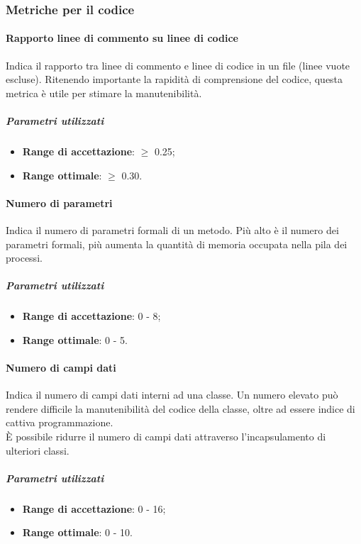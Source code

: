 \documentclass[../PianoDiQualifica.tex]{subfiles}
\begin{document}
			\subsubsection{Metriche per il codice}
				\paragraph{Rapporto linee di commento su linee di codice\\}
					Indica il rapporto tra linee di commento e linee di codice in un
					file (linee vuote escluse). Ritenendo importante la rapidità di
					comprensione del codice, questa metrica è utile per stimare la
					manutenibilità.
					\subparagraph{Parametri utilizzati}
						\begin{itemize}
							\item \textbf{Range di accettazione}: $\geq$ 0.25;
							\item \textbf{Range ottimale}: $\geq$ 0.30.
						\end{itemize}
				\paragraph{Numero di parametri\\}
					Indica il numero di parametri formali di un metodo. Più alto è il
					numero dei parametri formali, più aumenta la quantità di memoria
					occupata nella pila dei processi.
					\subparagraph{Parametri utilizzati}
						\begin{itemize}
							\item \textbf{Range di accettazione}: 0 - 8;
							\item \textbf{Range ottimale}: 0 - 5.
						\end{itemize}
				\paragraph{Numero di campi dati\\}
					Indica il numero di campi dati interni ad una classe. Un numero
					elevato può rendere difficile la manutenibilità del codice della
					classe, oltre ad essere indice di cattiva programmazione.\\
					È possibile ridurre il numero di campi dati attraverso
					l'incapsulamento di ulteriori classi.
					\subparagraph{Parametri utilizzati}
						\begin{itemize}
							\item \textbf{Range di accettazione}: 0 - 16;
							\item \textbf{Range ottimale}: 0 - 10.
						\end{itemize}
\end{document}
